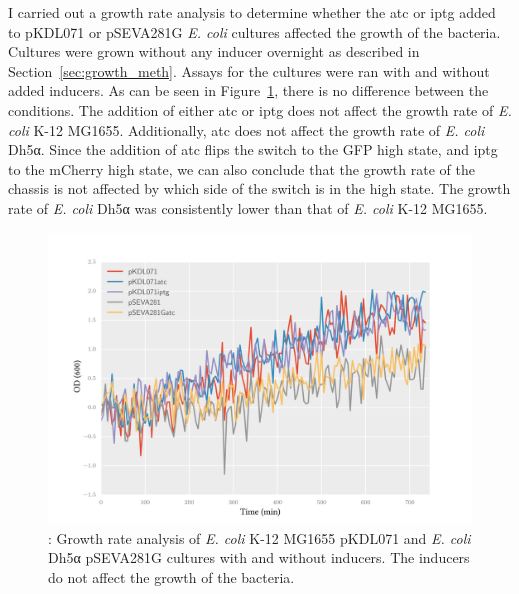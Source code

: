 I carried out a growth rate analysis to determine whether the \acrshort{atc} or \acrshort{iptg} added to pKDL071 or pSEVA281G \textit{E. coli} cultures affected the growth of the bacteria. Cultures were grown without any inducer overnight as described in Section~\ref{sec:growth_meth}. Assays for the cultures were ran with and without added inducers. As can be seen in Figure~\ref{fig:growth_curve}, there is no difference between the conditions. The addition of either \acrshort{atc} or \acrshort{iptg} does not affect the growth rate of \textit{E. coli} K-12 MG1655. Additionally, \acrshort{atc} does not affect the growth rate of \textit{E. coli} Dh5α. Since the addition of \acrshort{atc} flips the switch to the GFP high state, and \acrshort{iptg} to the mCherry high state, we can also conclude that the growth rate of the chassis is not affected by which side of the switch is in the high state. The growth rate of \textit{E. coli} Dh5α was consistently lower than that of \textit{E. coli} K-12 MG1655.

\begin{figure}[tb]
	\begin{center}
		\includegraphics[scale=0.6]{../../chapters/chapterABCFlow/images/growth_curves.png}
		\caption[Growth rate curves of cultures with and without inducers]{\label{fig:growth_curve}: Growth rate analysis of \textit{E. coli} K-12 MG1655 pKDL071 and \textit{E. coli} Dh5α pSEVA281G cultures with and without inducers. The inducers do not affect the growth of the bacteria. }
	\end{center}
\end{figure}

\clearpage



